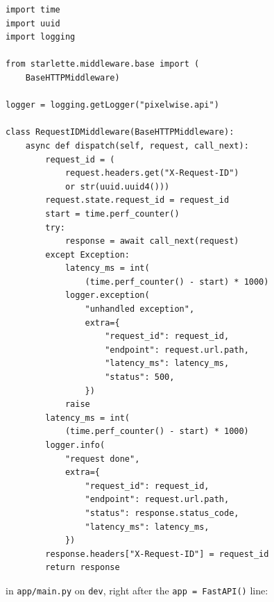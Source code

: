 
\begin{verbatim}
import time
import uuid
import logging

from starlette.middleware.base import (
    BaseHTTPMiddleware)

logger = logging.getLogger("pixelwise.api")

class RequestIDMiddleware(BaseHTTPMiddleware):
    async def dispatch(self, request, call_next):
        request_id = (
            request.headers.get("X-Request-ID")
            or str(uuid.uuid4()))
        request.state.request_id = request_id
        start = time.perf_counter()
        try:
            response = await call_next(request)
        except Exception:
            latency_ms = int(
                (time.perf_counter() - start) * 1000)
            logger.exception(
                "unhandled exception",
                extra={
                    "request_id": request_id,
                    "endpoint": request.url.path,
                    "latency_ms": latency_ms,
                    "status": 500,
                })
            raise
        latency_ms = int(
            (time.perf_counter() - start) * 1000)
        logger.info(
            "request done",
            extra={
                "request_id": request_id,
                "endpoint": request.url.path,
                "status": response.status_code,
                "latency_ms": latency_ms,
            })
        response.headers["X-Request-ID"] = request_id
        return response
\end{verbatim}


 in \texttt{app/main.py} on
\texttt{dev}, right after the \texttt{app = FastAPI()} line:

